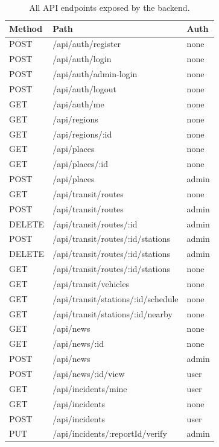 \begin{table}[H]
    \centering
    \caption{All API endpoints exposed by the backend.}
    \label{tab:endpoints}
    \begin{tabularx}{\textwidth}{l X l}
        \toprule
        \textbf{Method} & \textbf{Path} & \textbf{Auth} \\
        \midrule
        POST & /api/auth/register & none \\
        POST & /api/auth/login & none \\
        POST & /api/auth/admin-login & none \\
        POST & /api/auth/logout & none \\
        GET & /api/auth/me & none \\
        GET & /api/regions & none \\
        GET & /api/regions/:id & none \\
        GET & /api/places & none \\
        GET & /api/places/:id & none \\
        POST & /api/places & admin \\
        GET & /api/transit/routes & none \\
        POST & /api/transit/routes & admin \\
        DELETE & /api/transit/routes/:id & admin \\
        POST & /api/transit/routes/:id/stations & admin \\
        DELETE & /api/transit/routes/:id/stations & admin \\
        GET & /api/transit/routes/:id/stations & none \\
        GET & /api/transit/vehicles & none \\
        GET & /api/transit/stations/:id/schedule & none \\
        GET & /api/transit/stations/:id/nearby & none \\
        GET & /api/news & none \\
        GET & /api/news/:id & none \\
        POST & /api/news & admin \\
        POST & /api/news/:id/view & user \\
        GET & /api/incidents/mine & user \\
        GET & /api/incidents & none \\
        POST & /api/incidents & user \\
        PUT & /api/incidents/:reportId/verify & admin \\

\end{tabularx}
\end{table}

